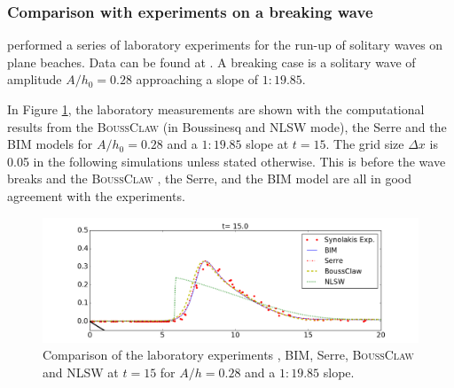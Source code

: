 \documentclass[review]{elsarticle}
\newcommand{\BoussClaw}{\textsc{BoussClaw} }
\begin{document}
\subsubsection{Comparison with experiments on a breaking wave}
\label{sec:wave_break}


\citet{synolakis1987runup} 
performed a series of laboratory experiments 
for the run-up of solitary waves on plane beaches.
Data can be found at \cite{synolakis2007standards}.
A breaking case is a solitary wave of amplitude $A/h_0=0.28$ 
approaching a slope of $1:19.85$. 


In Figure \ref{fig:lab_bim}, the laboratory measurements
are shown with the computational results from the \BoussClaw (in Boussinesq and  NLSW mode),  the Serre and the BIM models
for $A/h_0=0.28$ and a $1:19.85$ slope at $t=15$. 
The grid size $\Delta x$ is 0.05 in the following simulations
unless stated otherwise.
This is before the wave breaks and
the \BoussClaw, the Serre, and the  BIM model are all in good agreement with the experiments.


\begin{figure}[!htb]
\centering
\includegraphics[width=\textwidth]{_fig/lab_bim_bouss_t15.png}
\caption{Comparison of the laboratory experiments \citep{synolakis1987runup}, BIM, Serre, \BoussClaw and NLSW at $t=15$ for $A/h=0.28$ 
and a $1:19.85$ slope.}
\label{fig:lab_bim}
\end{figure}
\end{document}
